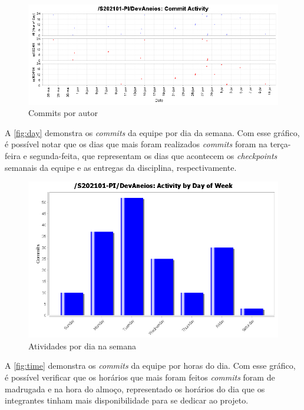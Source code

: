 \begin{figure}[htb]
    \centering
	\includegraphics[width=16cm]{imagens/commitscatterauthors.png}
	\caption{\label{fig:commitsauthors} Commits por autor}
\end{figure}
\FloatBarrier

A \autoref{fig:day} demonstra os \textit{commits} da equipe por dia da semana. Com esse gráfico, é possível notar que os dias que mais foram realizados \textit{commits} foram na terça-feira e segunda-feita, que representam os dias que acontecem os \textit{checkpoints} semanais da equipe e as entregas da disciplina, respectivamente.

\begin{figure}[htb]
    \centering
	\includegraphics[width=16cm]{imagens/activity_day.png}
	\caption{\label{fig:day} Atividades por dia na semana}
\end{figure}
\FloatBarrier

A \autoref{fig:time} demonstra os \textit{commits} da equipe por horas do dia. Com esse gráfico, é possível verificar que os horários que mais foram feitos \textit{commits} foram de madrugada e na hora do almoço, representado os horários do dia que os integrantes tinham mais disponibilidade para se dedicar ao projeto.

